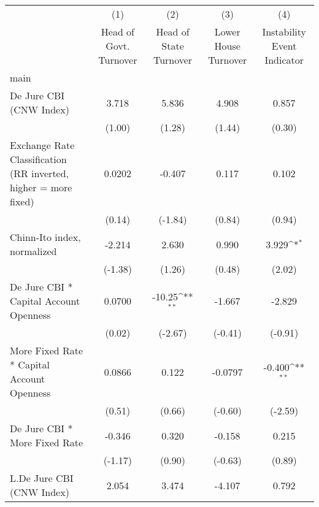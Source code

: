 {
\def\sym#1{\ifmmode^{#1}\else\(^{#1}\)\fi}
\begin{longtable}{l*{4}{c}}
\toprule\endfirsthead\midrule\endhead\midrule\endfoot\endlastfoot
                &\multicolumn{1}{c}{(1)}&\multicolumn{1}{c}{(2)}&\multicolumn{1}{c}{(3)}&\multicolumn{1}{c}{(4)}\\
                &\multicolumn{1}{c}{Head of Govt. Turnover}&\multicolumn{1}{c}{Head of State Turnover}&\multicolumn{1}{c}{Lower House Turnover}&\multicolumn{1}{c}{Instability Event Indicator}\\
\midrule
main            &                  &                  &                  &                  \\
De Jure CBI (CNW Index)&    3.718         &    5.836         &    4.908         &    0.857         \\
                &   (1.00)         &   (1.28)         &   (1.44)         &   (0.30)         \\
\addlinespace
Exchange Rate Classification (RR inverted, higher = more fixed)&   0.0202         &   -0.407         &    0.117         &    0.102         \\
                &   (0.14)         &  (-1.84)         &   (0.84)         &   (0.94)         \\
\addlinespace
Chinn-Ito index, normalized&   -2.214         &    2.630         &    0.990         &    3.929\sym{*}  \\
                &  (-1.38)         &   (1.26)         &   (0.48)         &   (2.02)         \\
\addlinespace
De Jure CBI * Capital Account Openness&   0.0700         &   -10.25\sym{**} &   -1.667         &   -2.829         \\
                &   (0.02)         &  (-2.67)         &  (-0.41)         &  (-0.91)         \\
\addlinespace
More Fixed Rate * Capital Account Openness&   0.0866         &    0.122         &  -0.0797         &   -0.400\sym{**} \\
                &   (0.51)         &   (0.66)         &  (-0.60)         &  (-2.59)         \\
\addlinespace
De Jure CBI * More Fixed Rate&   -0.346         &    0.320         &   -0.158         &    0.215         \\
                &  (-1.17)         &   (0.90)         &  (-0.63)         &   (0.89)         \\
\addlinespace
L.De Jure CBI (CNW Index)&    2.054         &    3.474         &   -4.107         &    0.792         \\

\end{longtable}}
